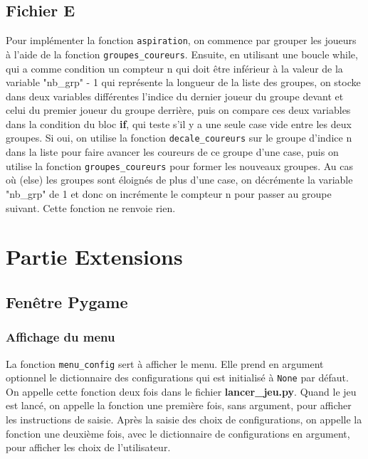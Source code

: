 \documentclass{article}
\begin{document}
\subsection{Fichier E}

Pour implémenter la fonction \texttt{aspiration}, on commence par grouper les joueurs à l'aide de la fonction \texttt{groupes\_coureurs}. Ensuite, en utilisant une boucle while, qui a comme condition un compteur n qui doit être inférieur à la valeur de la variable "nb\_grp" - 1 qui représente la longueur de la liste des groupes, on stocke dans deux variables différentes l'indice du dernier joueur du groupe devant et celui du premier joueur du groupe derrière, puis on compare ces deux variables dans la condition du bloc \textbf{if}, qui teste s'il y a une seule case vide entre les deux groupes. Si oui, on utilise la fonction \texttt{decale\_coureurs} sur le groupe d'indice n dans la liste pour faire avancer les coureurs de ce groupe d'une case, puis on utilise la fonction \texttt{groupes\_coureurs} pour former les nouveaux groupes. Au cas où (else) les groupes sont éloignés de plus d'une case, on décrémente la variable "nb\_grp" de 1 et donc on incrémente le compteur n pour passer au groupe suivant. Cette fonction ne renvoie rien.

\section{Partie Extensions}

\subsection{Fenêtre Pygame}

\subsubsection{Affichage du menu}

La fonction \texttt{menu\_config} sert à afficher le menu. Elle prend en argument optionnel le dictionnaire des configurations qui est initialisé à \texttt{None} par défaut. On appelle cette fonction deux fois dans le fichier \textbf{lancer\_jeu.py}. Quand le jeu est lancé, on appelle la fonction une première fois, sans argument, pour afficher les instructions de saisie. Après la saisie des choix de configurations, on appelle la fonction une deuxième fois, avec le dictionnaire de configurations en argument, pour afficher les choix de l'utilisateur.
\end{document}
